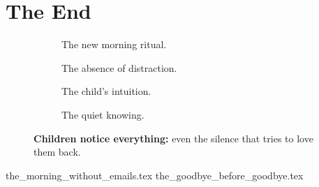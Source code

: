 
\section{The End}

\vfill

\begin{figure}[H]
    \centering

    \begin{subfigure}[t]{0.45\textwidth}
    \centering
    \caption*{The new morning ritual.}
    \end{subfigure}
    \hfill
    \begin{subfigure}[t]{0.45\textwidth}
    \centering
    \caption*{The absence of distraction.}
    \end{subfigure}

    \vspace{1em}

    \begin{subfigure}[t]{0.45\textwidth}
    \centering
    \caption*{The child's intuition.}
    \end{subfigure}
    \hfill
    \begin{subfigure}[t]{0.45\textwidth}
    \centering
    \caption*{The quiet knowing.}
    \end{subfigure}

    \caption*{\textbf{Children notice everything:} even the silence that tries to love them back.}
\end{figure}




{the_morning_without_emails.tex}
{the_goodbye_before_goodbye.tex}